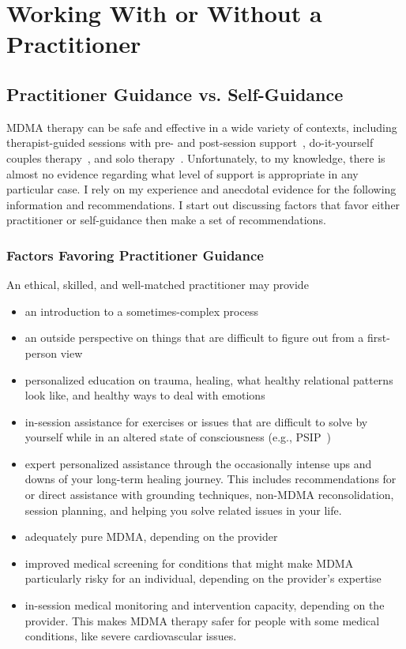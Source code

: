 \documentclass[11pt,oneside]{book}
\let\cite\parencite
\begin{document}
\chapter{Working With or Without a Practitioner}
\section{Practitioner Guidance vs. Self-Guidance}
\label{professionalVSSelf}
MDMA therapy can be safe and effective in a wide variety of contexts, including therapist-guided sessions with pre- and post-session support~\cite{mitchellMDMAClinicalTrial2,mitchellMDMAClinicalTrial}, do-it-yourself couples therapy~\cite{colbertEvenings}, and solo therapy~\cite{hillsSolo}. Unfortunately, to my knowledge, there is almost no evidence regarding what level of support is appropriate in any particular case. I rely on my experience and anecdotal evidence for the following information and recommendations. I start out discussing factors that favor either practitioner or self-guidance then make a set of recommendations.

\subsection*{Factors Favoring Practitioner Guidance}
An ethical, skilled, and well-matched practitioner may provide
\begin{itemize}
    \item an introduction to a sometimes-complex process
    \item an outside perspective on things that are difficult to figure out from a first-person view
    \item personalized education on trauma, healing, what healthy relational patterns look like, and healthy ways to deal with emotions
    \item in-session assistance for exercises or issues that are difficult to solve by yourself while in an altered state of consciousness (e.g., PSIP~\cite{razviPSIP})
    \item expert personalized assistance through the occasionally intense ups and downs of your long-term healing journey. This includes recommendations for or direct assistance with grounding techniques, non-MDMA reconsolidation, session planning, and helping you solve related issues in your life.
    \item adequately pure MDMA, depending on the provider
    \item improved medical screening for conditions that might make MDMA particularly risky for an individual, depending on the provider's expertise
    \item in-session medical monitoring and intervention capacity, depending on the provider. This makes MDMA therapy safer for people with some medical conditions, like severe cardiovascular issues.
\end{itemize}
\end{document}

